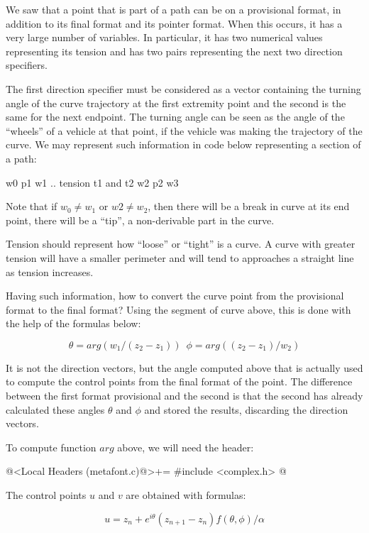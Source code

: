 
We saw that a point that is part of a path can be on a provisional
format, in addition to its final format and its pointer format. When
this occurs, it has a very large number of variables. In particular,
it has two numerical values ​​representing its tension and has two pairs
representing the next two direction specifiers.

The first direction specifier must be considered as a vector
containing the turning angle of the curve trajectory at the first
extremity point and the second is the same for the next endpoint. The
turning angle can be seen as the angle of the ``wheels'' of a vehicle
at that point, if the vehicle was making the trajectory of the
curve. We may represent such information in code below representing a
section of a path:

\alinhaverbatim
{w0} p1 {w1} .. tension t1 and t2 {w2} p2 {w3} 
\alinhanormal

Note that if $w_0\neq w_1$ or $w2 \neq w_2$, then there will be a
break in curve at its end point, there will be a ``tip'', a
non-derivable part in the curve.

Tension should represent how ``loose'' or ``tight'' is a curve. A
curve with greater tension will have a smaller perimeter and will tend
to approaches a straight line as tension increases.

Having such information, how to convert the curve point from the
provisional format to the final format? Using the segment of curve
above, this is done with the help of the formulas below:

$$
\theta = arg(w_1/(z_2-z_1))\,\,\,\phi = arg((z_2-z_1)/w_2)
$$

It is not the direction vectors, but the angle computed above that is
actually used to compute the control points from the final format of
the point. The difference between the first format provisional and the
second is that the second has already calculated these angles $\theta$
and $\phi$ and stored the results, discarding the direction vectors.

To compute function $arg$ above, we will need the header:

\iniciocodigo
@<Local Headers (metafont.c)@>+=
#include <complex.h>
@
\fimcodigo

The control points $u$ and $v$ are obtained with formulas:

$$
u = z_{n} + e^{i\theta}(z_{n+1}-z_n)f(\theta, \phi)/\alpha
$$

